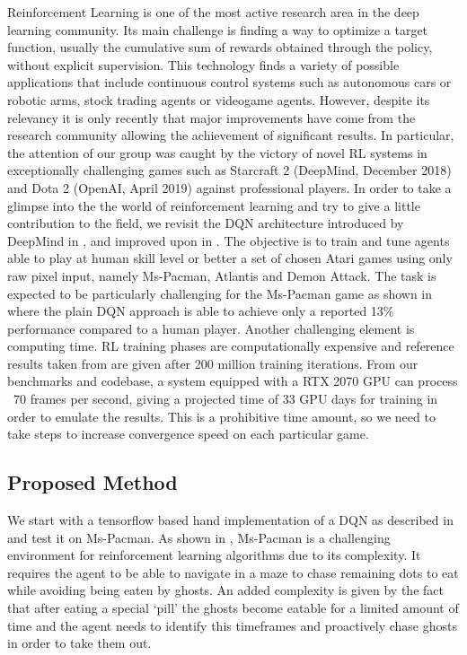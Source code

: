 \documentclass[10pt,twocolumn,letterpaper]{article}
\begin{document}
Reinforcement Learning is one of the most active research area in the deep learning community. Its main challenge is finding a way to optimize a target function, usually the cumulative sum of rewards obtained through the policy, without explicit supervision. This technology finds a variety of possible applications that include continuous control systems such as autonomous cars or robotic arms, stock trading agents or videogame agents. However, despite its relevancy it is only recently that major improvements have come from the research community allowing the achievement of significant results.
In particular, the attention of our group was caught by the victory of novel RL systems in exceptionally challenging games such as Starcraft 2 (DeepMind, December 2018) and Dota 2 (OpenAI, April 2019) against professional players. In order to take a glimpse into the the world of reinforcement learning and try to give a little contribution to the field, we revisit the DQN architecture introduced by DeepMind in \cite{DBLP:journals/corr/MnihKSGAWR13}, and improved upon in \cite{DBLP:journals/corr/abs-1710-02298}. The objective is to train and tune agents able to play at human skill level or better a set of chosen Atari games using only raw pixel input, namely Ms-Pacman, Atlantis and Demon Attack. The task is expected to be particularly challenging for the Ms-Pacman game as shown in \cite{humancontrol} where the plain DQN approach is able to achieve only a reported 13\% performance compared to a human player.
Another challenging element is computing time. RL training phases are computationally expensive and reference results taken from \cite{DBLP:journals/corr/abs-1710-02298} are given after 200 million training iterations. From our benchmarks and codebase, a system equipped with a RTX 2070 GPU can process ~70 frames per second, giving a projected time of 33 GPU days for training in order to emulate the results. This is a prohibitive time amount, so we need to take steps to increase convergence speed on each particular game.


\subsection{Proposed Method}

We start with a tensorflow based hand implementation of a DQN as described in \cite{DBLP:journals/corr/MnihKSGAWR13} and test it on Ms-Pacman. As shown in \cite{humancontrol}, Ms-Pacman is a challenging environment for reinforcement learning algorithms due to its complexity. It requires the agent to be able to navigate in a maze to chase remaining dots to eat while avoiding being eaten by ghosts. An added complexity is given by the fact that after eating a special `pill' the ghosts become eatable for a limited amount of time and the agent needs to identify this timeframes and proactively chase ghosts in order to take them out.
\end{document}
